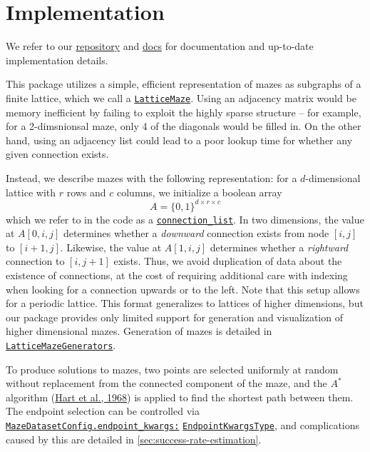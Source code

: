 \documentclass[10pt,a4paper,onecolumn]{article}
\begin{document}
\hypertarget{sec:implementation}{%
\section{Implementation}\label{sec:implementation}}

We refer to our
\href{https://github.com/understanding-search/maze-dataset}{repository}
and
\href{https://understanding-search.github.io/maze-dataset/maze_dataset.html}{docs}
for documentation and up-to-date implementation details.

This package utilizes a simple, efficient representation of mazes as
subgraphs of a finite lattice, which we call a
\href{https://understanding-search.github.io/maze-dataset/maze_dataset.html\#LatticeMaze}{\texttt{LatticeMaze}}.
Using an adjacency matrix would be memory inefficient by failing to
exploit the highly sparse structure -- for example, for a 2-dimsnionsal
maze, only 4 of the diagonals would be filled in. On the other hand,
using an adjacency list could lead to a poor lookup time for whether any
given connection exists.

Instead, we describe mazes with the following representation: for a
\(d\)-dimensional lattice with \(r\) rows and \(c\) columns, we
initialize a boolean array \[
  A = \{0, 1\}^{d \times r \times c}
\] which we refer to in the code as a
\href{https://understanding-search.github.io/maze-dataset/maze_dataset.html\#LatticeMaze.connection_list}{\texttt{connection\_list}}.
In two dimensions, the value at \(A[0,i,j]\) determines whether a
\emph{downward} connection exists from node \([i,j]\) to \([i+1, j]\).
Likewise, the value at \(A[1,i,j]\) determines whether a
\emph{rightward} connection to \([i, j+1]\) exists. Thus, we avoid
duplication of data about the existence of connections, at the cost of
requiring additional care with indexing when looking for a connection
upwards or to the left. Note that this setup allows for a periodic
lattice. This format generalizes to lattices of higher dimensions, but
our package provides only limited support for generation and
visualization of higher dimensional mazes. Generation of mazes is
detailed in
\href{https://understanding-search.github.io/maze-dataset/maze_dataset.html\#LatticeMazeGenerators}{\texttt{LatticeMazeGenerators}}.

To produce solutions to mazes, two points are selected uniformly at
random without replacement from the connected component of the maze, and
the \(A^*\) algorithm (\protect\hyperlink{ref-A_star}{Hart et al.,
1968}) is applied to find the shortest path between them. The endpoint
selection can be controlled via
\href{https://understanding-search.github.io/maze-dataset/maze_dataset/dataset/maze_dataset_config.html\#MazeDatasetConfig.endpoint_kwargs}{\texttt{MazeDatasetConfig.endpoint\_kwargs:}}
\href{https://understanding-search.github.io/maze-dataset/maze_dataset/dataset/maze_dataset_config.html\#EndpointKwargsType}{\texttt{EndpointKwargsType}},
and complications caused by this are detailed in
\autoref{sec:success-rate-estimation}.
\end{document}
